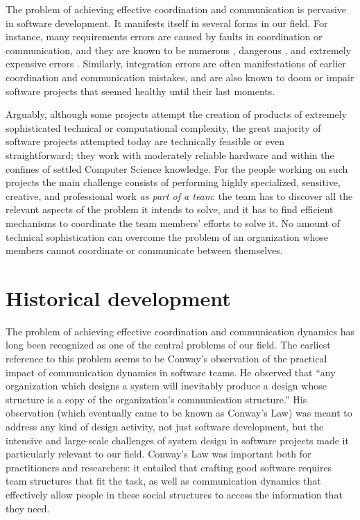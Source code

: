 The problem of achieving effective coordination and communication is pervasive in software development. It manifests itself in several forms in our field. For instance, many requirements errors are caused by faults in coordination or communication, and they are known to be numerous \cite{Jones1996}, dangerous \cite{Neumann1995}, and extremely expensive errors \cite{Boehm1988}. Similarly, integration errors are often manifestations of earlier coordination and communication mistakes, and are also known to doom or impair software projects that seemed healthy until their last moments.

Arguably, although some projects attempt the creation of products of extremely sophisticated technical or computational complexity, the great majority of software projects attempted today are technically feasible or even straightforward; they work with moderately reliable hardware and within the confines of settled Computer Science knowledge. For the people working on such projects the main challenge consists of performing highly specialized, sensitive, creative, and professional work \emph{as part of a team}: the team has to discover all the relevant aspects of the problem it intends to solve, and it has to find efficient mechanisms to coordinate the team members' efforts to solve it. No amount of technical sophistication can overcome the problem of an organization whose members cannot coordinate or communicate between themselves.


\section{Historical development}

The problem of achieving effective coordination and communication dynamics has long been recognized as one of the central problems of our field. The earliest reference to this problem seems to be Conway's  observation of the practical impact of communication dynamics in software teams. He observed that ``any organization which designs a system will inevitably produce a design whose structure is a copy of the organization's communication structure.'' His observation (which eventually came to be known as Conway's Law) was meant to address any kind of design activity, not just software development, but the intensive and large-scale challenges of system design in software projects made it particularly relevant to our field. Conway's Law was important both for practitioners and researchers: it entailed that crafting good software requires team structures that fit the task, as well as communication dynamics that effectively allow people in these social structures to access the information that they need.

